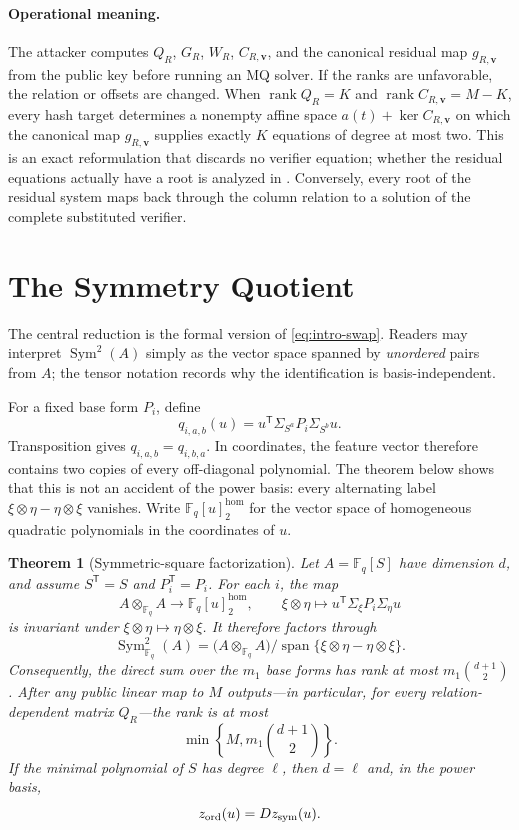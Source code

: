 \documentclass[11pt]{article}
\newtheorem{theorem}{Theorem}
\newcommand{\F}{\mathbb F}
\newcommand{\Sym}{\operatorname{Sym}}
\newcommand{\rank}{\operatorname{rank}}
\newcommand{\Span}{\operatorname{span}}
\newcommand{\transpose}{\mathsf T}
\begin{document}
\paragraph{Operational meaning.}
The attacker computes $Q_R$, $G_R$, $W_R$, $C_{R,\mathbf v}$, and the canonical
residual map $g_{R,\mathbf v}$ from the public key before running an MQ solver.  If the ranks are unfavorable, the relation or offsets
are changed.  When $\rank Q_R=K$ and $\rank C_{R,\mathbf v}=M-K$, every hash target determines a
nonempty affine space $a(t)+\ker C_{R,\mathbf v}$ on which the canonical map
$g_{R,\mathbf v}$ supplies exactly $K$ equations of degree at most two.  This is an exact reformulation that discards no verifier
equation; whether the residual equations actually have a root is analyzed in
.  Conversely, every root of the residual system maps back
through the column relation to a solution of the complete substituted verifier.

\section{The Symmetry Quotient}\label{sec:symmetry}

The central reduction is the formal version of
\eqref{eq:intro-swap}.  Readers may interpret $\Sym^2(A)$ simply as the vector
space spanned by \emph{unordered} pairs from $A$; the tensor notation records
why the identification is basis-independent.

For a fixed base form $P_i$, define
\[
  q_{i,a,b}(u)=u^\transpose\Sigma_{S^a}P_i\Sigma_{S^b}u.
\]
Transposition gives $q_{i,a,b}=q_{i,b,a}$.  In coordinates, the feature vector
therefore contains two copies of every off-diagonal polynomial.  The theorem
below shows that this is not an accident of the power basis: every alternating
label $\xi\otimes\eta-\eta\otimes\xi$ vanishes.  Write
$\F_q[u]^{\mathrm{hom}}_2$ for the vector space of homogeneous quadratic
polynomials in the coordinates of $u$.

\begin{theorem}[Symmetric-square factorization]\label{thm:symmetric-square}
Let $A=\F_q[S]$ have dimension $d$, and assume $S^\transpose=S$ and
$P_i^\transpose=P_i$.  For each $i$, the map
\[
 A\otimes_{\F_q}A\longrightarrow \F_q[u]^{\mathrm{hom}}_2,
 \qquad
 \xi\otimes\eta\longmapsto
 u^\transpose\Sigma_\xi P_i\Sigma_\eta u
\]
is invariant under $\xi\otimes\eta\mapsto\eta\otimes\xi$.  It therefore
factors through
\[
 \Sym^2_{\F_q}(A)
 =\bigl(A\otimes_{\F_q}A\bigr)
   \big/\Span\{\xi\otimes\eta-\eta\otimes\xi\}.
\]
Consequently, the direct sum over the $m_1$ base forms has rank at most
$m_1\binom{d+1}{2}$.  After any public linear map to $M$ outputs---in
particular, for every relation-dependent matrix $Q_R$---the rank is at most
\begin{equation}\label{eq:symmetry-rank}
 \min\left\{M,m_1\binom{d+1}{2}\right\}.
\end{equation}
If the minimal polynomial of $S$ has degree $\ell$, then $d=\ell$ and, in the
power basis,
\begin{equation}\label{eq:duplication}
 z_{\rm ord}(u)=Dz_{\rm sym}(u).
\end{equation}
\end{theorem}
\end{document}
